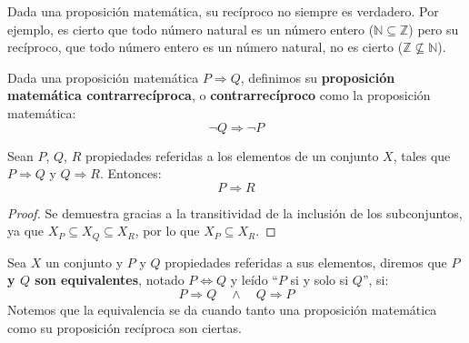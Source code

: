 \begin{observacion}
    Dada una proposición matemática, su recíproco no siempre es verdadero. Por ejemplo, es cierto que todo número natural es un número entero ($\mathbb{N} \subseteq \mathbb{Z}$) pero su recíproco, que todo número entero es un número natural, no es cierto ($\mathbb{Z} \nsubseteq \mathbb{N}$).
\end{observacion}

\begin{definicion}[Contrarrecíproco]
    Dada una proposición matemática $P\Longrightarrow Q$, definimos su \textbf{proposición matemática contrarrecíproca}, o \textbf{contrarrecíproco} como la proposición matemática:
    \begin{equation*}
        \lnot Q \Longrightarrow \lnot P
    \end{equation*}
\end{definicion}

\begin{prop}[Transitividad]
    Sean $P$, $Q$, $R$ propiedades referidas a los elementos de un conjunto $X$, tales que $P \Longrightarrow Q$
    y $Q \Longrightarrow R$. Entonces:
    $$P \Longrightarrow R$$
\end{prop}
\begin{proof}
    Se demuestra gracias a la transitividad de la inclusión de los subconjuntos, ya que $X_P\subseteq X_Q\subseteq X_R$, por lo que $X_P\subseteq X_R$.
\end{proof}

\begin{definicion}[Equivalencia]
    Sea $X$ un conjunto y $P$ y $Q$ propiedades referidas a sus elementos, diremos que \textbf{$P$ y $Q$ son equivalentes}, notado $P \Longleftrightarrow Q$ y leído ``$P$ si y solo si $Q$'', si:
    $$P \Longrightarrow Q \quad\land\quad Q \Longrightarrow P$$
    Notemos que la equivalencia se da cuando tanto una proposición matemática como su proposición recíproca son ciertas.
\end{definicion}

